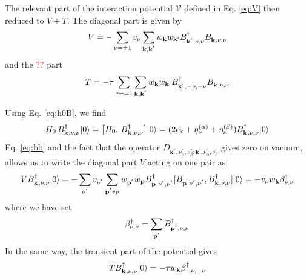 \documentclass[11pt]{article} %
\newcommand{\ns}[1]{\textcolor{red}{#1}}
\begin{document}
The relevant part of the interaction potential $\mathcal{V}$ defined in Eq. \ref{eq:V} then reduced to $V+T$. The diagonal part is given by 
\begin{equation}
V=-\sum_{\nu=\pm1}v_{\nu}\sum_{\mathbf{k},\mathbf{k}^{'}}
w_{\mathbf{k}}w_{\mathbf{k}'}
B^{\dagger}_{\mathbf{k}^{'},\nu,\nu}
B^{}_{\mathbf{k}^{ },\nu,\nu}
\end{equation}
and the \ns{??} part 
\begin{equation}
T=-\tau\sum_{\nu=\pm1}\sum_{\mathbf{k},\mathbf{k}^{'}}
w_{\mathbf{k}}w_{\mathbf{k}'}
B^{\dagger}_{\mathbf{k}^{'},-\nu,-\nu}
B^{}_{\mathbf{k}^{ },\nu,\nu}
\end{equation}

Using Eq. \ref{eq:h0B}, we find
\begin{equation}
H_0\,B^{\dagger}_{\mathbf{k}^{ },\nu,\nu}|0\rangle=
\big[H_0,\,B^{\dagger}_{\mathbf{k}^{ },\nu,\nu}\big]|0\rangle=
(2\epsilon_{\mathbf{k}}+\eta_{\nu}^{(\alpha)}+\eta_{\nu}^{(\beta)})B^{\dagger}_{\mathbf{k}^{ },\nu,\nu}|0\rangle
\end{equation}
Eq. \ref{eq:bb} and the fact that the operator $D^{}_{\mathbf{k}^{'' },\nu_{\alpha}^{''},\nu_{\beta}^{''};\mathbf{k}^{' },\nu_{\alpha}^{'},\nu_{\beta}^{'}}$ gives zero on vacuum, allows us to write the diagonal part $V$ acting on one pair as 
\begin{equation}
VB^{\dagger}_{\mathbf{k}^{ },\nu,\nu}|0\rangle=-\sum_{\nu^{'}}v_{\nu^{'}}\sum_{\mathbf{p}^{'}vp^{}}w_{\mathbf{p}^{'}}w_{\mathbf{p}}B^{\dagger}_{\mathbf{p}^{ },\nu^{'},\nu^{'}}[B^{}_{\mathbf{p}^{ },\nu^{'},\nu^{'}},B^{\dagger}_{\mathbf{k}^{ },\nu,\nu}]|0\rangle=-v_{\nu}w_{\mathbf{k}}\beta^{\dagger}_{\nu,\nu}
\end{equation}
where we have set
\begin{equation}
\beta^{\dagger}_{\nu,\nu}=\sum_{\mathbf{p}^{'}}B^{\dagger}_{\mathbf{p}^{'},\nu,\nu}
\end{equation}
In the same way, the transient part of the potential gives
\begin{equation}
TB^{\dagger}_{\mathbf{k}^{ },\nu,\nu}|0\rangle=-\tau{}w_{\mathbf{k}}\beta^{\dagger}_{-\nu,-\nu}
\end{equation}
\end{document}
